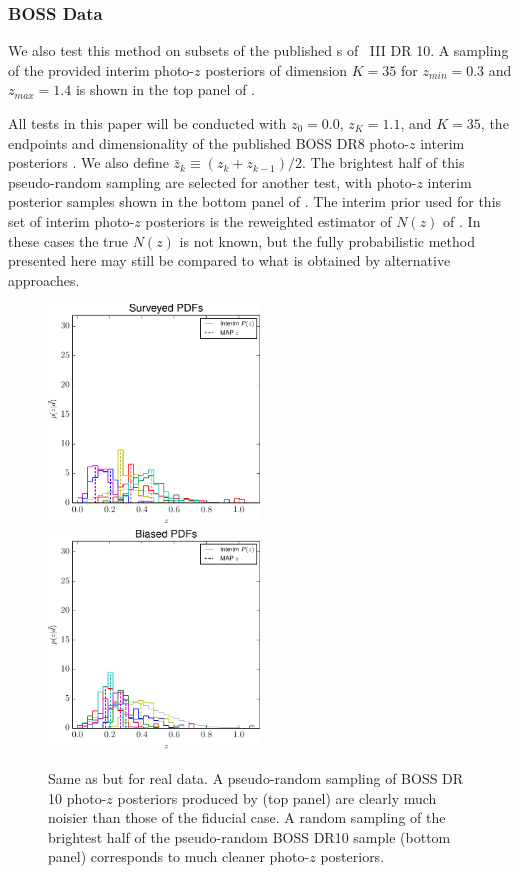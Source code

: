 \subsubsection{BOSS Data}

We also test this method on subsets of the published \pzpdf s of \sdss\ III DR 10. 
A sampling of the provided interim photo-$z$ posteriors of dimension $K=35$ for $z_{min}=0.3$ and $z_{max}=1.4$ is shown in the top panel of .  

All tests in this paper will be conducted with $z_{0}=0.0$, $z_{K}=1.1$, and $K=35$, the endpoints and dimensionality of the published BOSS DR8 photo-$z$ interim posteriors \citet{Sheldon2012}.  
We also define $\bar{z}_{k}\equiv(z_{k}+z_{k-1})/2$.
The brightest half of this pseudo-random sampling are selected for another test, with photo-$z$ interim posterior samples shown in the bottom panel of .  
The interim prior used for this set of interim photo-$z$ posteriors is the reweighted estimator of $N(z)$ of \citet{Sheldon2012}.  
In these cases the true $N(z)$ is not known, but the fully probabilistic method presented here may still be compared to what is obtained by alternative approaches.

\begin{figure}
	\includegraphics[width=0.5\textwidth]{figures/chippr/boss_samplepzs.pdf}\\
	\includegraphics[width=0.5\textwidth]{figures/chippr/bias_samplepzs.pdf}
	\caption{Same as  but for real data.  
		A pseudo-random sampling of BOSS DR 10 photo-$z$ posteriors produced by \citet{Sheldon2012} (top panel) are clearly much noisier than those of the fiducial case.  
		A random sampling of the brightest half of the pseudo-random BOSS DR10 sample (bottom panel) corresponds to much cleaner photo-$z$ posteriors.}
\end{figure}

